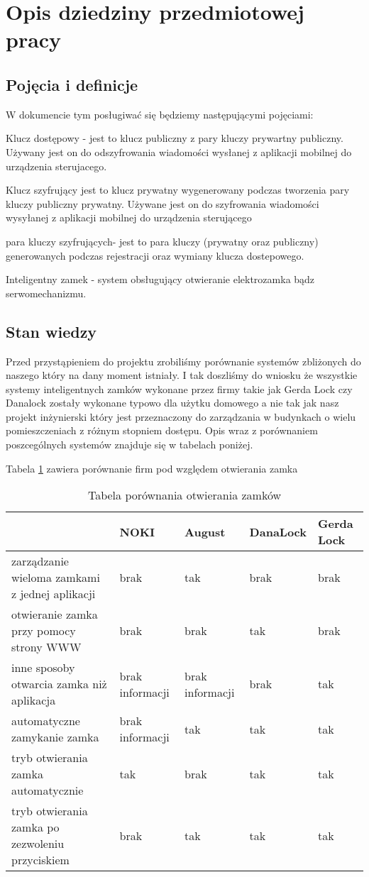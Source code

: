 % 
\newpage\section{Opis dziedziny przedmiotowej pracy}\label{sec:dziedzina}
\subsection{Pojęcia i definicje}
W dokumencie tym posługiwać się będziemy następującymi pojęciami:

Klucz dostępowy - jest to klucz publiczny z pary kluczy prywartny publiczny. Używany jest on do odszyfrowania wiadomości wysłanej z aplikacji mobilnej do urządzenia sterujacego.

Klucz szyfrujący jest to klucz prywatny wygenerowany podczas tworzenia pary kluczy publiczny prywatny. Używane jest on do szyfrowania wiadomości wysyłanej z aplikacji mobilnej do urządzenia sterującego

para kluczy szyfrujących- jest to para kluczy (prywatny oraz publiczny) generowanych podczas rejestracji oraz wymiany klucza dostepowego.

Inteligentny zamek - system obsługujący otwieranie elektrozamka bądz serwomechanizmu.

\newpage
\subsection{Stan wiedzy}
Przed przystąpieniem do projektu zrobiliśmy porównanie systemów zbliżonych do naszego który na dany moment istniały. I tak doszliśmy do wniosku że wszystkie systemy inteligentnych zamków wykonane przez firmy takie jak Gerda Lock czy Danalock zostały wykonane typowo dla użytku domowego a nie tak jak nasz projekt inżynierski który jest przeznaczony do zarządzania w budynkach o wielu pomieszczeniach z różnym stopniem dostępu. Opis wraz z porównaniem poszcególnych systemów znajduje się w tabelach poniżej.


	Tabela \ref{tab:porownanie1} zawiera porównanie firm pod względem otwierania zamka
	\begin{longtable}[!ht]{|p{4cm}|p{}|p{}|p{}|p{}|} 
		\caption{Tabela porównania otwierania zamków}
		\label{tab:porownanie1}\\
		\hline	
		 & NOKI & August & DanaLock & Gerda Lock  \\	\hline
		 zarządzanie wieloma zamkami z jednej aplikacji
		 & brak & tak & brak & brak \\	\hline
		otwieranie zamka przy pomocy strony WWW
		& brak & brak & tak & brak \\	\hline
		inne sposoby otwarcia zamka niż aplikacja
		& brak informacji& brak informacji & brak & tak \\	\hline
		automatyczne zamykanie zamka
		& brak informacji& tak & tak & tak   \\	\hline
		tryb otwierania zamka automatycznie
		& tak& brak & tak & tak \\	\hline	
		tryb otwierania zamka po zezwoleniu przyciskiem
		& brak & tak & tak & tak \\		\hline
	\end{longtable}


